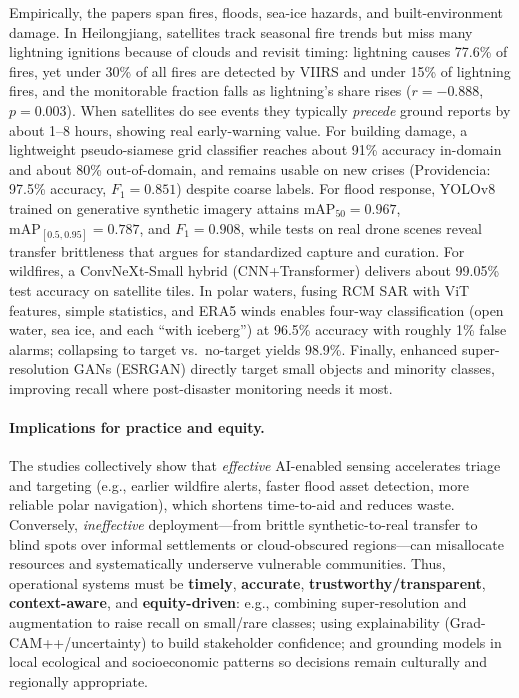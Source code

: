 \documentclass[conference,a4paper]{IEEEtran}
\begin{document}
Empirically, the papers span fires, floods, sea-ice hazards, and built-environment damage. In Heilongjiang, satellites track seasonal fire trends but miss many lightning ignitions because of clouds and revisit timing: lightning causes 77.6\% of fires, yet under 30\% of all fires are detected by VIIRS and under 15\% of lightning fires, and the monitorable fraction falls as lightning’s share rises ($r=-0.888$, $p=0.003$). When satellites do see events they typically \emph{precede} ground reports by about 1--8 hours, showing real early-warning value. For building damage, a lightweight pseudo-siamese grid classifier reaches about 91\% accuracy in-domain and about 80\% out-of-domain, and remains usable on new crises (Providencia: 97.5\% accuracy, $F_1=0.851$) despite coarse labels. For flood response, YOLOv8 trained on generative synthetic imagery attains $\text{mAP}_{50}=0.967$, $\text{mAP}_{[0.5,0.95]}=0.787$, and $F_1=0.908$, while tests on real drone scenes reveal transfer brittleness that argues for standardized capture and curation. For wildfires, a ConvNeXt-Small hybrid (CNN+Transformer) delivers about 99.05\% test accuracy on satellite tiles. In polar waters, fusing RCM SAR with ViT features, simple statistics, and ERA5 winds enables four-way classification (open water, sea ice, and each “with iceberg”) at 96.5\% accuracy with roughly 1\% false alarms; collapsing to target vs.\ no-target yields 98.9\%. Finally, enhanced super-resolution GANs (ESRGAN) directly target small objects and minority classes, improving recall where post-disaster monitoring needs it most.

\paragraph{Implications for practice and equity.}
The studies collectively show that \emph{effective} AI-enabled sensing accelerates triage and targeting (e.g., earlier wildfire alerts, faster flood asset detection, more reliable polar navigation), which shortens time-to-aid and reduces waste. Conversely, \emph{ineffective} deployment---from brittle synthetic-to-real transfer to blind spots over informal settlements or cloud-obscured regions---can misallocate resources and systematically underserve vulnerable communities. Thus, operational systems must be \textbf{timely}, \textbf{accurate}, \textbf{trustworthy/transparent}, \textbf{context-aware}, and \textbf{equity-driven}: e.g., combining super-resolution and augmentation to raise recall on small/rare classes; using explainability (Grad-CAM++/uncertainty) to build stakeholder confidence; and grounding models in local ecological and socioeconomic patterns so decisions remain culturally and regionally appropriate.
\end{document}

